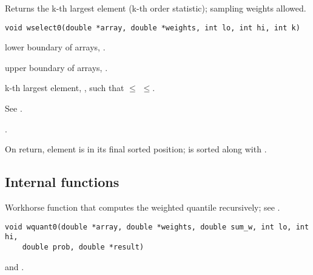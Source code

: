 \documentclass[a4paper,oneside,10pt,DIV=12]{scrreprt}
\begin{document}
\begin{Description}
Returns the k-th largest element (k-th order statistic); sampling weights 
allowed.
\end{Description}
\begin{Usage}
\begin{verbatim}
void wselect0(double *array, double *weights, int lo, int hi, int k)
\end{verbatim}
\end{Usage}
\begin{Arguments}
	\begin{ldescription}
		\item[\code{lo}] lower boundary of arrays, . 
		\item[\code{hi}] upper boundary of arrays, .
		\item[\code{k}] k-th largest element, , such that 
			$\leq$ $\leq$. 
	\end{ldescription}
\end{Arguments}
\begin{Details}
See .
\end{Details}
\begin{Dependency}
	.
\end{Dependency}
\begin{Value}
On return, element  is in its final sorted position; 
 is sorted along with .
\end{Value}

\clearpage
\subsection*{Internal functions}
%

\begin{Description}
Workhorse function that computes the weighted quantile recursively; see 
.
\end{Description}
\begin{Usage}
\begin{verbatim}
void wquant0(double *array, double *weights, double sum_w, int lo, int hi,
    double prob, double *result)
\end{verbatim}
\end{Usage}
\begin{Dependencies}
	 and 
	.
\end{Dependencies}
\end{document}
